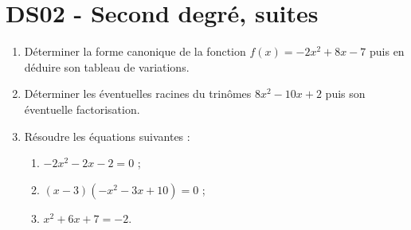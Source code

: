 \documentclass[a4paper,11pt]{article}
\author{Pierquet}
\title{\nomfichier}
\begin{document}
\pagestyle{fancy}

\thispagestyle{enteteds}

\setcounter{numexos}{0}

\part{DS02 - Second degré, suites}

\smallskip

\nomprenomtcbox

\medskip


\begin{enumerate}
	\item Déterminer la forme canonique de la fonction $f(x)=-2x^2+8x-7$ puis en déduire son tableau de variations.
	\item Déterminer les éventuelles racines du trinômes $8x^2-10x+2$ puis son éventuelle factorisation.
	\item Résoudre les équations suivantes :
	\begin{enumerate}
		\item $-2x^2-2x-2=0$ ;
		\item $(x-3)(-x^2-3x+10)=0$ ;
		\item $x^2+6x+7=-2$.
	\end{enumerate}
\end{enumerate}

\bigskip

\end{document}
